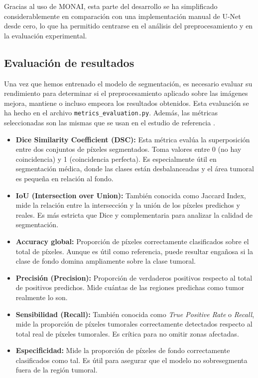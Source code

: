 \documentclass[12pt]{article}
\begin{document}
Gracias al uso de MONAI, esta parte del desarrollo se ha simplificado considerablemente en comparación con una implementación manual de U-Net desde cero, lo que ha permitido centrarse en el análisis del preprocesamiento y en la evaluación experimental.

\subsection{Evaluación de resultados}

Una vez que hemos entrenado el modelo de segmentación, es necesario evaluar su rendimiento para determinar si el preprocesamiento aplicado sobre las imágenes mejora, mantiene o incluso empeora los resultados obtenidos. Esta evaluación se ha hecho en el archivo \texttt{metrics\_evaluation.py}. Además, las métricas seleccionadas son las mismas que se usan en el estudio de referencia \cite{cai2022study}.

\begin{itemize}
    \item \textbf{Dice Similarity Coefficient (DSC):} Esta métrica evalúa la superposición entre dos conjuntos de píxeles segmentados. Toma valores entre 0 (no hay coincidencia) y 1 (coincidencia perfecta). Es especialmente útil en segmentación médica, donde las clases están desbalanceadas y el área tumoral es pequeña en relación al fondo.

    \item \textbf{IoU (Intersection over Union):} También conocida como Jaccard Index, mide la relación entre la intersección y la unión de los píxeles predichos y reales. Es más estricta que Dice y complementaria para analizar la calidad de segmentación.

    \item \textbf{Accuracy global:} Proporción de píxeles correctamente clasificados sobre el total de píxeles. Aunque es útil como referencia, puede resultar engañosa si la clase de fondo domina ampliamente sobre la clase tumoral.

    \item \textbf{Precisión (Precision):} Proporción de verdaderos positivos respecto al total de positivos predichos. Mide cuántas de las regiones predichas como tumor realmente lo son.

    \item \textbf{Sensibilidad (Recall):} También conocida como \textit{True Positive Rate} o \textit{Recall}, mide la proporción de píxeles tumorales correctamente detectados respecto al total real de píxeles tumorales. Es crítica para no omitir zonas afectadas.

    \item \textbf{Especificidad:} Mide la proporción de píxeles de fondo correctamente clasificados como tal. Es útil para asegurar que el modelo no sobresegmenta fuera de la región tumoral.

\end{itemize}
\end{document}
